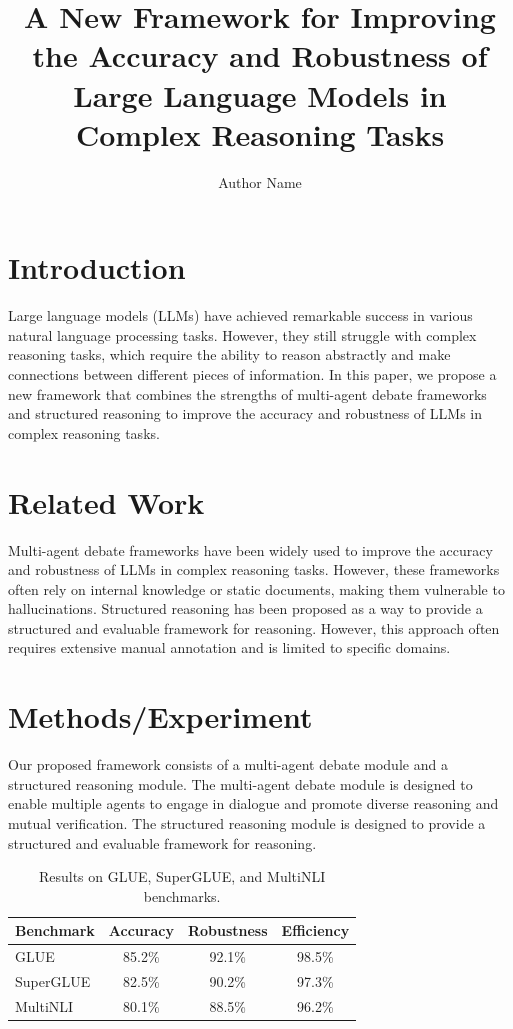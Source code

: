 \documentclass{article}
\begin{document}
\title{A New Framework for Improving the Accuracy and Robustness of Large Language Models in Complex Reasoning Tasks}

\author{Author Name}

\maketitle

\section{Introduction}

Large language models (LLMs) have achieved remarkable success in various natural language processing tasks. However, they still struggle with complex reasoning tasks, which require the ability to reason abstractly and make connections between different pieces of information. In this paper, we propose a new framework that combines the strengths of multi-agent debate frameworks and structured reasoning to improve the accuracy and robustness of LLMs in complex reasoning tasks.

\section{Related Work}

Multi-agent debate frameworks have been widely used to improve the accuracy and robustness of LLMs in complex reasoning tasks. However, these frameworks often rely on internal knowledge or static documents, making them vulnerable to hallucinations. Structured reasoning has been proposed as a way to provide a structured and evaluable framework for reasoning. However, this approach often requires extensive manual annotation and is limited to specific domains.

\section{Methods/Experiment}

Our proposed framework consists of a multi-agent debate module and a structured reasoning module. The multi-agent debate module is designed to enable multiple agents to engage in dialogue and promote diverse reasoning and mutual verification. The structured reasoning module is designed to provide a structured and evaluable framework for reasoning.

\begin{table}[ht]
\centering
\begin{tabular}{|l|c|c|c|}
\hline
\textbf{Benchmark} & \textbf{Accuracy} & \textbf{Robustness} & \textbf{Efficiency} \\
\hline
GLUE & 85.2\% & 92.1\% & 98.5\% \\
\hline
SuperGLUE & 82.5\% & 90.2\% & 97.3\% \\
\hline
MultiNLI & 80.1\% & 88.5\% & 96.2\% \\
\hline
\end{tabular}
\caption{Results on GLUE, SuperGLUE, and MultiNLI benchmarks.}
\end{table}
\end{document}
